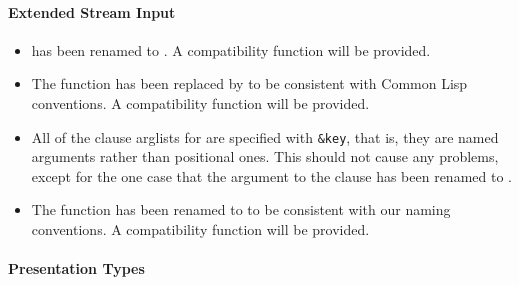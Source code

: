 \paragraph {Extended Stream Input}

\begin{itemize}
\item {} has been renamed to
.  A compatibility function will be provided.

\item The function  has been replaced by
 to be consistent with Common Lisp
conventions.  A compatibility function will be provided.

\item All of the clause arglists for  are specified with
{\tt\&key}, that is, they are named arguments rather than positional ones.
This should not cause any problems, except for the one case that the
 argument to the  clause has been renamed to
.

\item The function  has been renamed to
 to be consistent with our naming conventions.  A
compatibility function will be provided.
\end{itemize}


\paragraph {Presentation Types}

